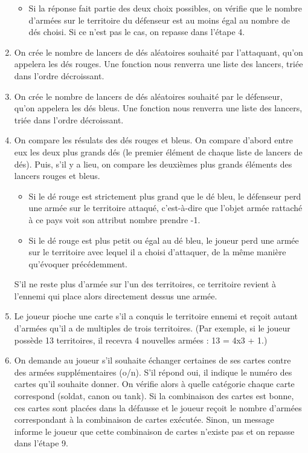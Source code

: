 \begin{enumerate}
\begin{itemize}
        \item Si la réponse fait partie des deux choix possibles, on vérifie que le nombre d'armées sur le territoire du défenseur est au moins égal au nombre de dés choisi. Si ce n'est pas le cas, on repasse dans l'étape 4.
    \end{itemize}
    \vspace{0.2cm}
    \item On crée le nombre de lancers de dés aléatoires souhaité par l'attaquant, qu'on appelera les dés rouges. Une fonction nous renverra une liste des lancers, triée dans l'ordre décroissant.
    \vspace{0.2cm}
    \item On crée le nombre de lancers de dés aléatoires souhaité par le défenseur, qu'on appelera les dés bleus. Une fonction nous renverra une liste des lancers, triée dans l'ordre décroissant.
    \vspace{0.2cm}
    \item On compare les résulats des dés rouges et bleus. On compare d'abord entre eux les deux plus grands dés (le premier élément de chaque liste de lancers de dés). Puis, s'il y a lieu, on compare les deuxièmes plus grands éléments des lancers rouges et bleus.
    \begin{itemize}
        \item Si le dé rouge est strictement plus grand que le dé bleu, le défenseur perd une armée sur le territoire attaqué, c'est-à-dire que l'objet armée rattaché à ce pays voit son attribut nombre prendre -1.
        \item Si le dé rouge est plus petit ou égal au dé bleu, le joueur perd une armée sur le territoire avec lequel il a choisi d'attaquer, de la même manière qu'évoquer précédemment.
    \end{itemize}
    S'il ne reste plus d'armée sur l'un des territoires, ce territoire revient à l'ennemi qui place alors directement dessus une armée.
    \vspace{0.2cm}
    \item Le joueur pioche une carte s'il a conquis le territoire ennemi et reçoit autant d'armées qu'il a de multiples de trois territoires. (Par exemple, si le joueur possède 13 territoires, il recevra 4 nouvelles armées : 13 = 4x3 + 1.)
    \vspace{0.2cm}
    \item On demande au joueur s'il souhaite échanger certaines de ses cartes contre des armées supplémentaires (o/n). S'il répond oui, il indique le numéro des cartes qu'il souhaite donner. On vérifie alors à quelle catégorie chaque carte correspond (soldat, canon ou tank). Si la combinaison des cartes est bonne, ces cartes sont placées dans la défausse et le joueur reçoit le nombre d'armées correspondant à la combinaison de cartes exécutée. Sinon, un message informe le joueur que cette combinaison de cartes n'existe pas et on repasse dans l'étape 9.

\end{enumerate}
